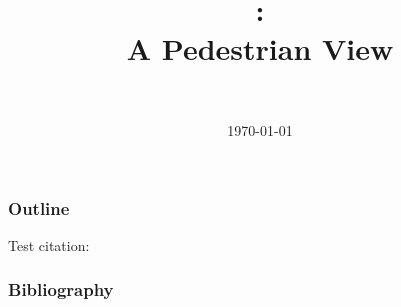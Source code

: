\documentclass[ ]{beamer}
\title[\pdes]{\pdes:\\A Pedestrian View}
\author[Daniel Topa]{\TopaHII \\ \TopaHIIEmail}
\institute{\missiontech}
\date{\today}
\begin{document}
\begin{frame}
    \titlepage
\end{frame}

\begin{frame}[ allowframebreaks ]\frametitle{Outline}
	\tableofcontents[ hideallsubsections ]
Test citation: \cite{10.5555/889797}
\end{frame}

	

\begin{frame}[allowframebreaks]
    \frametitle{Bibliography}
    \nocite{*}
    \printbibliography
\end{frame}
\end{document}
